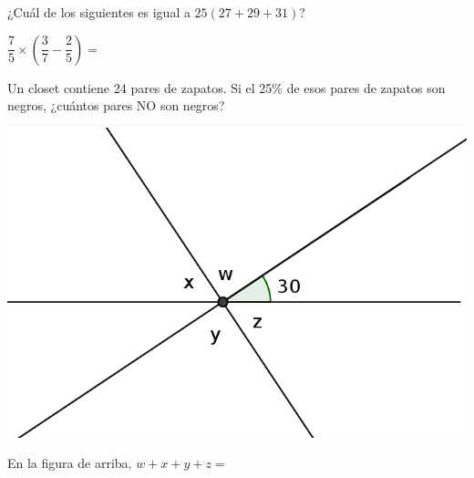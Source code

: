 \documentclass[letterpaper,10pt]{examdesign}
\begin{document}
\begin{multiplechoice}[keycolumns=4,examcolumns=2]
\begin{block}
\begin{question}
\end{question}
\end{block}
\begin{question}
¿Cuál de los siguientes es igual a $25(27+29+31)$?
\end{question}
\begin{question}
$\dfrac{7}{5}\times \left(\dfrac{3}{7}-\dfrac{2}{5}\right)=$
\end{question}
\begin{question}
Un closet contiene 24 pares de zapatos. Si el 25\% de esos pares de zapatos son negros, ¿cuántos pares NO son negros?
\end{question}
\begin{block}
\includegraphics[scale=1.1]{Images/anguloswxyz.png} 
\begin{question}
En la figura de arriba, $w+x+y+z=$
\end{question}
\end{block}
\begin{block}

\end{block}
\end{multiplechoice}
\end{document}
